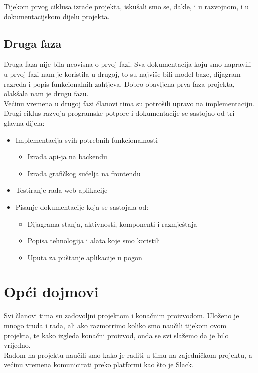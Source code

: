 	 	Tijekom prvog ciklusa izrade projekta, iskušali smo se, dakle, i u razvojnom, i u dokumentacijskom dijelu projekta. 
	 
	 \subsection{Druga faza}
	 
	 Druga faza nije bila neovisna o prvoj fazi. Sva dokumentacija koju smo napravili u prvoj fazi nam je koristila u drugoj, to su najviše bili model baze, dijagram razreda i popis funkcionalnih zahtjeva. Dobro obavljena prva faza projekta, olakšala nam je drugu fazu.\\
	 Većinu vremena u drugoj fazi članovi tima su potrošili upravo na implementaciju.\\
	 
	 Drugi ciklus razvoja programske potpore i dokumentacije se sastojao od tri glavna dijela: 
	 \begin{itemize}
	 	\item Implementacija svih potrebnih funkcionalnosti
	 	\begin{itemize}
	 		\item Izrada api-ja na backendu
	 		\item Izrada grafičkog sučelja na frontendu
	 	\end{itemize}
 		\item Testiranje rada web aplikacije
	 	\item Pisanje dokumentacije koja se sastojala od:
	 	\begin{itemize}
	 		\item Dijagrama stanja, aktivnosti, komponenti i razmještaja
	 		\item Popisa tehnologija i alata koje smo koristili
	 		\item Uputa za puštanje aplikacije u pogon
	 	\end{itemize}
	 \end{itemize}
	 
	 \section{Opći dojmovi}
	 Svi članovi tima su zadovoljni projektom i konačnim proizvodom. Uloženo je mnogo truda i rada, ali ako razmotrimo koliko smo naučili tijekom ovom projekta, te kako izgleda konačni proizvod, onda se svi slažemo da je bilo vrijedno.\\
	 
	 Radom na projektu naučili smo kako je raditi u timu na zajedničkom projektu, a većinu vremena komunicirati preko platformi kao što je Slack.\\
	 
